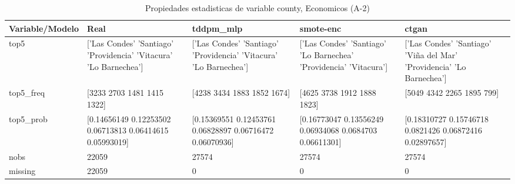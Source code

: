 \begin{table}[H]
\centering
\fontsize{8}{14}\selectfont
\caption{Propiedades  estadisticas de variable county, Economicos (A-2)}
\label{table-stats-economicos-a-2-county}
\begin{tabular}{|l|m{10em}|m{10em}|m{10em}|m{10em}|}
\hline
 \rowcolor[gray]{0.8}
Variable/Modelo & Real & tddpm\_mlp & smote-enc & ctgan \\
\hline top5 & ['Las Condes' 'Santiago' 'Providencia' 'Vitacura' 'Lo Barnechea'] & ['Las Condes' 'Santiago' 'Providencia' 'Vitacura' 'Lo Barnechea'] & ['Las Condes' 'Santiago' 'Lo Barnechea' 'Providencia' 'Vitacura'] & ['Las Condes' 'Santiago' 'Viña del Mar' 'Providencia' 'Lo Barnechea'] \\
\hline top5\_freq & [3233 2703 1481 1415 1322] & [4238 3434 1883 1852 1674] & [4625 3738 1912 1888 1823] & [5049 4342 2265 1895  799] \\
\hline top5\_prob & [0.14656149 0.12253502 0.06713813 0.06414615 0.05993019] & [0.15369551 0.12453761 0.06828897 0.06716472 0.06070936] & [0.16773047 0.13556249 0.06934068 0.0684703  0.06611301] & [0.18310727 0.15746718 0.0821426  0.06872416 0.02897657] \\
\hline nobs & 22059 & 27574 & 27574 & 27574 \\
\hline missing & 22059 & 0 & 0 & 0 \\
\hline
\end{tabular}
\end{table}
